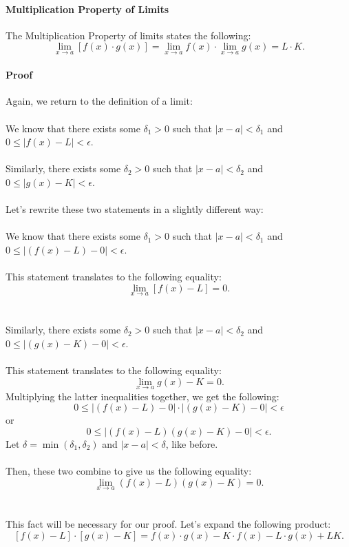 \documentclass{article}
\begin{document}
\paragraph{Multiplication Property of Limits} The Multiplication Property of limits states the following:
\[\lim_{x\to a}[f(x)\cdot g(x)]=\lim_{x\to a}f(x) \cdot \lim_{x\to a}g(x)=L\cdot K.\]

\paragraph{Proof} Again, we return to the definition of a limit:
\\
\\
We know that there exists some $\delta_1>0$ such that $\left|x-a\right|<\delta_1$ and $0\leq\left|f(x)-L\right|<\epsilon$.
\\
\\
Similarly, there exists some $\delta_2>0$ such that $\left|x-a\right|<\delta_2$ and $0\leq\left|g(x)-K\right|<\epsilon$.
\\
\\
Let's rewrite these two statements in a slightly different way:
\\
\\
We know that there exists some $\delta_1>0$ such that $\left|x-a\right|<\delta_1$ and $0\leq\left|(f(x)-L)-0\right|<\epsilon$.
\\
\\
This statement translates to the following equality:
\[\lim_{x\to a} [f(x)-L] = 0.\]
\\
\\
Similarly, there exists some $\delta_2>0$ such that $\left|x-a\right|<\delta_2$ and $0\leq\left|(g(x)-K)-0\right|<\epsilon$.
\\
\\
This statement translates to the following equality:
\[\lim_{x\to a} g(x)-K = 0.\]
Multiplying the latter inequalities together, we get the following:
\[0\leq\left|(f(x)-L)-0\right|\cdot \left|(g(x)-K)-0\right|<\epsilon\]
or 
\[0\leq\left|(f(x)-L)(g(x)-K)-0\right|<\epsilon.\]
Let $\delta=\min(\delta_1,\delta_2)$ and $|x-a|<\delta$, like before.
\\
\\
Then, these two combine to give us the following equality:
\[\lim_{x\to a} (f(x)-L)(g(x)-K) = 0.\]
\\
\\
This fact will be necessary for our proof. Let's expand the following product:
\[[f(x)-L]\cdot [g(x)-K] = f(x)\cdot g(x) - K\cdot f(x) - L\cdot g(x) + LK.\]
\end{document}
